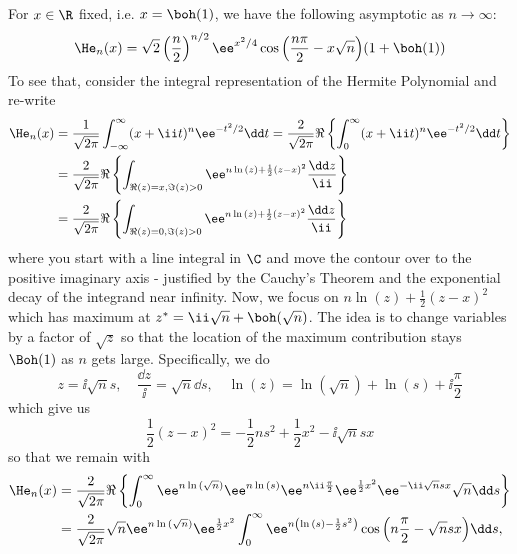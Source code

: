 \begin{exemplo} \cite{nica2025gaussianintegralformulahermite}
	For $x \in \R$ fixed, i.e. $x = \boh(1)$,  we have the following asymptotic as $n \rightarrow \infty$:
	\begin{equation}
		\He_n(x) = \sqrt{2} \left(\frac{n}{2}\right)^{n/2} \ee^{x^2/4} \cos{\left(\frac{n\pi}{2} - x \sqrt{n}\right)} (1 + \boh(1))
	\end{equation}
	To see that, consider the integral representation of the Hermite Polynomial and re-write
	\begin{align}
		\He_n(x) & = \frac{1}{\sqrt{2\pi}} \int_{-\infty}^{\infty} (x + \ii t)^n \ee^{-t^2/2} \dd t = \frac{2}{\sqrt{2\pi}} \Re\left\{ \int_{0}^{\infty} (x + \ii t)^n \ee^{-t^2/2} \dd t \right\} \\
		& = \frac{2}{\sqrt{2\pi}} \Re\left\{ \int_{\Re(z) = x, \Im(z)>0} \ee^{n\ln{(z)} + \frac{1}{2}(z-x)^2} \frac{\dd z}{\ii} \right\} \\
		& = \frac{2}{\sqrt{2\pi}} \Re\left\{ \int_{\Re(z) = 0, \Im(z)>0} \ee^{n\ln{(z)} + \frac{1}{2}(z-x)^2} \frac{\dd z}{\ii} \right\}
	\end{align}
	where you start with a line integral in $\C$ and move the contour over to the positive imaginary axis - justified by the Cauchy's Theorem and the exponential decay of the integrand near infinity. Now, we focus on $n\ln{(z)} + \frac{1}{2}(z-x)^2$ which has maximum at $z^* = \ii \sqrt{n} + \boh(\sqrt{n})$. The idea is to change variables by a factor of $\sqrt{z}$ so that the location of the maximum contribution stays $\Boh(1)$ as $n$ gets large. Specifically, we do
	\begin{equation}
		z = \ii \sqrt{n} s, \quad \frac{\dd z}{\ii} = \sqrt{n} \dd s, \quad \ln{(z)} = \ln{(\sqrt{n})} + \ln{(s)} + \ii \frac{\pi}{2}
	\end{equation}  
	which give us
	\begin{equation}
		\frac{1}{2}(z-x)^2 = -\frac{1}{2} ns^2 + \frac{1}{2} x^2 - \ii \sqrt{n} sx	
	\end{equation}
	so that we remain with
	\begin{align}
		\He_n(x) & = \frac{2}{\sqrt{2\pi}} \Re\left\{ \int_{0}^{\infty} \ee^{n\ln{(\sqrt{n})}} \ee^{n\ln{(s)}} \ee^{n\ii\frac{\pi}{2}} \ee^{\frac{1}{2}x^2}\ee^{-\ii\sqrt{n}sx} \sqrt{n} \dd s \right\} \\
		& = \frac{2}{\sqrt{2\pi}} \sqrt{n} \ee^{n\ln{(\sqrt{n})}} \ee^{\frac{1}{2}x^2}  \int_{0}^{\infty} \ee^{n\left(\ln{(s)} - \frac{1}{2}s^2 \right)} \cos{\left(n\frac{\pi}{2} - \sqrt{n} s x\right)} \dd s,

\end{align}
\end{exemplo}
